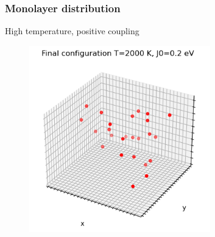 \documentclass{beamer}
\begin{document}
\begin{frame}
    \frametitle{Monolayer distribution}

    \centering High temperature, positive coupling

    \begin{figure}
        \includegraphics[width=0.7\textwidth]{images/erocco8.png}
    \end{figure}

\end{frame}
\end{document}

